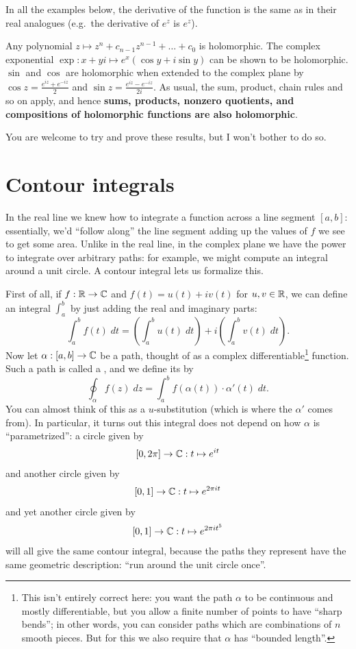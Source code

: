 \begin{example}
	In all the examples below, the derivative of the function
	is the same as in their real analogues
	(e.g.\ the derivative of $e^z$ is $e^z$).
	\begin{enumerate}[(a)]
		\ii Any polynomial $z \mapsto z^n + c_{n-1} z^{n-1} + \dots + c_0$ is holomorphic.
		\ii The complex exponential $\exp : x+yi \mapsto e^x (\cos y + i \sin y)$
		can be shown to be holomorphic.
		\ii $\sin$ and $\cos$ are holomorphic when extended
		to the complex plane by $\cos z = \frac{e^{iz}+e^{-iz}}{2}$
		and $\sin z = \frac{e^{iz}-e^{-iz}}{2i}$.
		\ii As usual, the sum, product, chain rules and so on apply,
		and hence \textbf{sums, products, nonzero quotients,
		and compositions of holomorphic functions are also holomorphic}.
	\end{enumerate}
\end{example}
You are welcome to try and prove these results, but I won't bother to do so.

\section{Contour integrals}
In the real line we knew how to integrate a function across a line segment $[a,b]$:
essentially, we'd ``follow along'' the line segment adding up the values of $f$ we see
to get some area.
Unlike in the real line, in the complex plane we have the power to integrate
over arbitrary paths: for example, we might compute an integral around a unit circle.
A contour integral lets us formalize this.

First of all, if $f : \mathbb R \to \mathbb C$ and $f(t) = u(t) + iv(t)$ for $u,v \in \mathbb R$,
we can define an integral $\int_a^b$ by just adding the real and imaginary parts:
\[ \int_a^b f(t) \; dt
	= \left( \int_a^b u(t) \; dt \right)
	+ i \left( \int_a^b v(t) \; dt \right). \]
Now let $\alpha : [a,b] \to \mathbb C$ be a path, thought of as
a complex differentiable\footnote{This isn't entirely correct here:
	you want the path $\alpha$ to be continuous and mostly differentiable,
	but you allow a finite number of points to have ``sharp bends''; in other words,
	you can consider paths which are combinations of $n$ smooth pieces.
	But for this we also require that $\alpha$ has ``bounded length''.} function.
Such a path is called a ,
and we define its  by
\[
	\oint_\alpha f(z) \; dz
	= \int_a^b f(\alpha(t)) \cdot \alpha'(t) \; dt.
\]
You can almost think of this as a $u$-substitution (which is where the $\alpha'$ comes from).
In particular, it turns out this integral does not depend on how $\alpha$ is ``parametrized'':
a circle given by \[ [0,2\pi] \to \mathbb C : t \mapsto e^{it} \]
and another circle given by \[ [0,1] \to \mathbb C : t \mapsto e^{2\pi i t} \]
and yet another circle given by \[ [0,1] \to \mathbb C : t \mapsto e^{2 \pi i t^5} \]
will all give the same contour integral, because the paths they represent have the same
geometric description: ``run around the unit circle once''.

